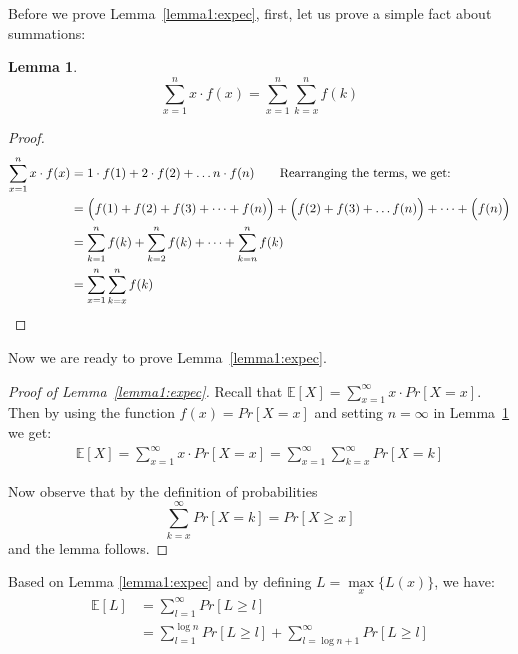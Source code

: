 \documentclass[11pt]{article}
\newtheorem{lemma}[theorem]{Lemma}
\begin{document}
Before we prove Lemma~\ref{lemma1:expec}, first, let us prove a simple fact about summations:

\begin{lemma}\label{lemma:sums}
$$\sum_{x=1}^n x \cdot f(x) = \sum_{x=1}^n\sum_{k=x}^n f(k)$$
\end{lemma}
\begin{proof}
  
\begin{align*}
    \sum_{x=1}^n x \cdot f(x) &= 1\cdot f(1) + 2\cdot f(2) + \dots n\cdot f(n) \qquad \mbox{Rearranging the terms, we get:} \\
    &= \Big( f(1) + f(2) + f(3) + \dots + f(n)\Big) + \Big( f(2) + f(3) + \dots f(n)\Big) + \dots + \Big(f(n)\Big) \\
  &= \sum_{k=1}^n f(k) + \sum_{k=2}^n f(k) + \dots + \sum_{k=n}^n f(k) \\
  &= \sum_{x=1}^n \sum_{k=x}^n f(k)  \qedhere
\end{align*}
\end{proof}

Now we are ready to prove Lemma~\ref{lemma1:expec}.
\begin{proof}[Proof of Lemma~\ref{lemma1:expec}]
Recall that $\mathbb{E}[X] = \sum\limits_{x=1}^\infty x\cdot Pr[X=x]$. Then by using the function $f(x) = Pr[X=x]$ and setting $n = \infty$ in Lemma~\ref{lemma:sums} we get:
\begin{align*}
     \mathbb{E}[X] = \sum_{x=1}^\infty x\cdot Pr[X=x]
      = \sum_{x=1}^{\infty} \sum_{k=x}^\infty Pr[X=k]  
\end{align*} 

Now observe that by the definition of probabilities 
$$\sum\limits_{k=x}^\infty Pr[X=k] =  Pr[X \geq x] $$
and the lemma follows.
\end{proof}
Based on Lemma \ref{lemma1:expec} and by defining $L = \max\limits_{x} \{L(x)\} $, we have:
\begin{align*}
    \mathbb{E}[L] &= \sum_{l=1}^{\infty} Pr[L \geq l]\\
    &= \sum_{l=1}^{\log n} Pr[L \geq l] + \sum_{l=\log n +1}^{\infty} Pr[L \geq l]\\
\end{align*}
\end{document}
